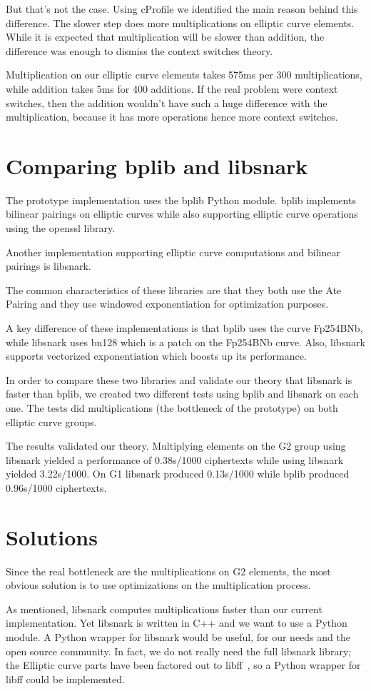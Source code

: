 \documentclass{article}
\begin{document}
But that's not the case. Using cProfile we identified the main
reason behind this difference. The slower step does more multiplications on
elliptic curve elements. While it is expected that multiplication will be slower
than addition, the difference was enough to dismiss the context switches theory.

Multiplication on our elliptic curve elements takes 575ms per 300
multiplications, while addition takes 5ms for 400 additions. If the real
problem were context switches, then the addition wouldn't have such a huge
difference with the multiplication, because it has more operations hence
more context switches.


\section{Comparing bplib and libsnark}

The prototype implementation uses the bplib\cite{bplib} Python module.
bplib implements bilinear pairings on elliptic curves while also supporting
elliptic curve operations using the openssl library.

Another implementation supporting elliptic curve computations and bilinear
pairings is libsnark\cite{libsnark}.

The common characteristics of these libraries are that they both use the
Ate Pairing and they use windowed exponentiation for
optimization purposes.

A key difference of these implementations is that bplib uses the
curve Fp254BNb, while libsnark uses bn128 which is a patch on the
Fp254BNb curve. Also, libsnark supports vectorized exponentiation
which boosts up its performance.

In order to compare these two libraries and validate our theory that
libsnark is faster than bplib, we created two different tests
using bplib and libsnark on each one. The tests did multiplications
(the bottleneck of the prototype) on both elliptic curve groups.

The results validated our theory. Multiplying elements on the G2
group using libsnark yielded a performance of 0.38s/1000 ciphertexts
while using libsnark yielded 3.22s/1000. On G1 libsnark produced
0.13s/1000 while bplib produced 0.96s/1000 ciphertexts.


\section{Solutions}

Since the real bottleneck are the multiplications on G2 elements,
the most obvious solution is to use optimizations on the multiplication
process.

As mentioned, libsnark computes multiplications faster than our
current implementation. Yet libsnark is written in C++ and we want to
use a Python module. A Python wrapper for libsnark would be useful,
for our needs and the open source community. In fact, we do not really
need the full libsnark library; the Elliptic curve parts have been
factored out to libff~\cite{libff}, so a Python wrapper for libff
could be implemented. 




\end{document}
